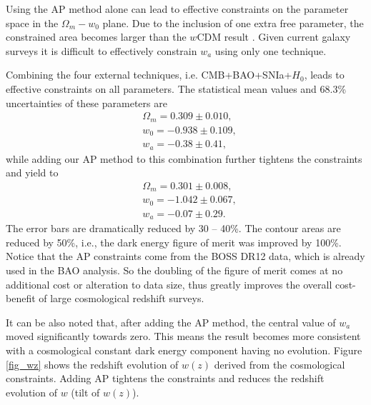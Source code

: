 \documentclass[iop]{emulateapj}
\begin{document}
Using the AP method alone can lead to effective constraints on the parameter space in the $\Omega_m-w_0$ plane.
Due to the inclusion of one extra free parameter, 
the constrained area becomes larger than the $w$CDM result \citep{Li2016}.
Given current galaxy surveys it is difficult to effectively constrain $w_a$ using only one technique.

Combining the four external techniques, i.e. CMB+BAO+SNIa+$H_0$, leads to effective constraints on all parameters.
The statistical mean values and 68.3\% uncertainties of these parameters are
\begin{eqnarray}
&\Omega_m = 0.309 \pm 0.010,\\
&w_0 = -0.938 \pm 0.109,\\
&w_a = -0.38 \pm 0.41,
\end{eqnarray}
while adding our AP method to this combination further tightens the constraints and yield to
\begin{eqnarray}
&\Omega_m = 0.301 \pm 0.008,\\
&w_0 = -1.042 \pm 0.067,\\
&w_a = -0.07 \pm 0.29.
\end{eqnarray}
The error bars are dramatically reduced by 30 -- 40\%.
The contour areas are reduced by 50\%, i.e., the dark energy figure of merit was improved by 100\%. 
Notice that the AP constraints come from the BOSS DR12 data, which is already used in the BAO analysis.
So the doubling of the figure of merit comes at no additional cost or alteration to data size,
thus greatly improves the overall cost-benefit of large cosmological redshift surveys.


It can be also noted that, after adding the AP method, the central value of $w_a$ moved significantly towards zero.
This means the result becomes more consistent with a cosmological constant dark energy component having no evolution.
Figure \ref{fig_wz} shows the redshift evolution of $w(z)$ derived from the cosmological constraints.
Adding AP tightens the constraints and reduces the redshift evolution of $w$ (tilt of $w(z)$).
\end{document}
